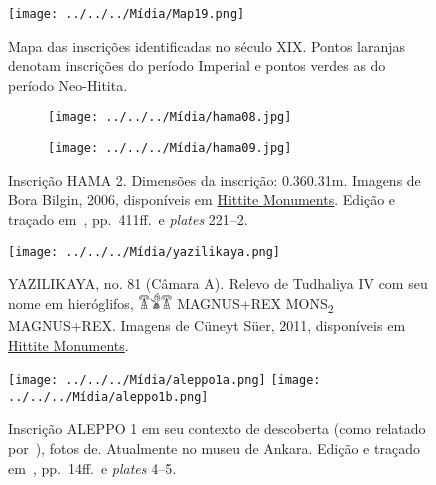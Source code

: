 \documentclass[article]{luvita}
\begin{document}
\begin{figure}[htb]
	\begin{center}
		\texttt{[image: ../../../Mídia/Map19.png]}
	\end{center}
	\caption{Mapa das inscrições identificadas no século XIX\@. Pontos laranjas
		denotam inscrições do período Imperial e pontos verdes as do período
		Neo-Hitita.}\label{fig:mapa19}
\end{figure}

\begin{figure}[htb]
	\centering
	\begin{subfigure}{0.49\textwidth}
		\texttt{[image: ../../../Mídia/hama08.jpg]}
	\end{subfigure}
	\begin{subfigure}{0.49\textwidth}
		\texttt{[image: ../../../Mídia/hama09.jpg]}
	\end{subfigure}
	\caption[HAMA 2]{Inscrição HAMA 2. Dimensões da inscrição:
		0.36\times0.31m.
		Imagens de Bora Bilgin, 2006,
		disponíveis em
		\href{https://www.hittitemonuments.com/hama/}{Hittite Monuments}.
		Edição e traçado em~, pp.\ 411ff.\ e \emph{plates}
		221--2.
	}\label{fig:hama2}
\end{figure}

\begin{figure}[htb]
	\begin{center}
		\texttt{[image: ../../../Mídia/yazilikaya.png]}
	\end{center}
	\caption{YAZILIKAYA, no. 81 (Câmara A).
		Relevo de Tudhaliya IV com seu nome em hieróglifos, 𔐒𔐃𔐒 MAGNUS+REX
		MONS\textsubscript{2} MAGNUS+REX\@.
		Imagens de Cüneyt Süer, 2011,
		disponíveis em
		\href{https://www.hittitemonuments.com/hama/}{Hittite Monuments}.
	}\label{fig:yazilikaya}
\end{figure}

\begin{figure}[htb]
	\begin{center}
		\texttt{[image: ../../../Mídia/aleppo1a.png]}
		\texttt{[image: ../../../Mídia/aleppo1b.png]}
	\end{center}
	\caption{Inscrição ALEPPO 1 em seu contexto de descoberta (como relatado
		por~\citet{UnexploredSyriaI}), fotos de. Atualmente no museu de Ankara.
		Edição e traçado em~, pp.\ 14ff.\ e \emph{plates} 4--5.}\label{fig:aleppo}
\end{figure}
\end{document}
